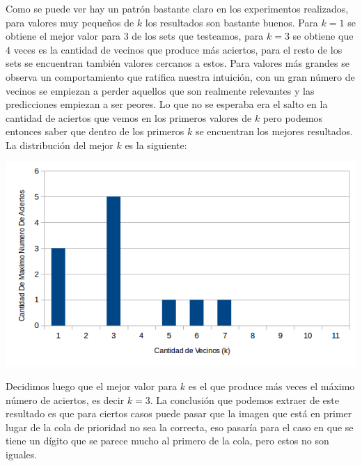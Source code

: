 Como se puede ver hay un patrón bastante claro en los experimentos realizados, para valores muy pequeños de $k$ los resultados son bastante buenos. Para $k=1$ se obtiene el mejor valor para $3$ de los sets que testeamos, para $k=3$ se obtiene que $4$ veces es la cantidad de vecinos que produce más aciertos, para el resto de los sets se encuentran también valores cercanos a estos. Para valores más grandes se observa un comportamiento que ratifica nuestra intuición, con un gran número de vecinos se empiezan a perder aquellos que son realmente relevantes y las predicciones empiezan a ser peores. Lo que no se esperaba era el salto en la cantidad de aciertos que vemos en los primeros valores de $k$ pero podemos entonces saber que dentro de los primeros $k$ se encuentran los mejores resultados.
\\
La distribución del mejor $k$ es la siguiente:
\begin{center}
\includegraphics[scale=0.55]{nuevosResultados/knn/max.png}
\end{center}
Decidimos luego que el mejor valor para $k$ es el que produce más veces el máximo número de aciertos, es decir $k=3$. La conclusión que podemos extraer de este resultado es que para ciertos casos puede pasar que la imagen que está en primer lugar de la cola de prioridad no sea la correcta, eso pasaría para el caso en que se tiene un dígito que se parece mucho al primero de la cola, pero estos no son iguales.

